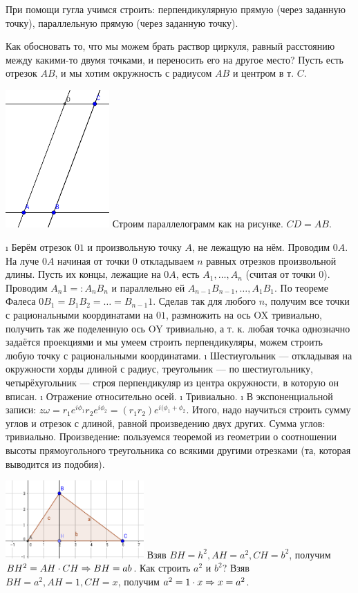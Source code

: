 \begin{solution}
При помощи гугла учимся строить: перпендикулярную прямую (через заданную точку), параллельную прямую (через заданную точку).

Как обосновать то, что мы можем брать раствор циркуля, равный расстоянию между какими-то двумя точками, и переносить его на другое место?
Пусть есть отрезок \(AB\), и мы хотим окружность с радиусом \(AB\) и центром в т. \(C\).

\includegraphics[width=1.56250in]{parallelogram.png}
Строим параллелограмм как на рисунке.
\(CD = AB\).

\begin{enumerate}
\def\labelenumi{\alph{enumi})}
\i
  Берём отрезок \(01\) и произвольную точку \(A\), не лежащую на нём. Проводим \(0A\). На луче \(0A\) начиная от точки \(0\) откладываем \(n\) равных отрезков произвольной длины. Пусть их концы, лежащие на \(0A\), есть \(A_1, \dots, A_n\) (считая от точки \(0\)). Проводим \(A_n1 =: A_n B_n\) и параллельно ей \(A_{n-1}B_{n-1}, \dots, A_1B_1\). По теореме Фалеса \(0B_1 = B_1B_2 = \dots = B_{n-1}1\). Сделав так для любого \(n\), получим все точки с рациональными координатами на \(01\), размножить на ось OX тривиально, получить так же поделенную ось OY тривиально, а т. к. любая точка однозначно задаётся проекциями и мы умеем строить перпендикуляры, можем строить любую точку с рациональными координатами.
\i
  Шестиугольник --- откладывая на окружности хорды длиной с радиус, треугольник --- по шестиугольнику, четырёхугольник --- строя перпендикуляр из центра окружности, в которую он вписан.
\i
  Отражение относительно осей.
\i
  Тривиально.
\i
  В экспоненциальной записи: \(z\omega = r_1e^{i\phi_1}r_2e^{i\phi_2}=(r_1r_2)e^{i(\phi_1 +\phi_2}\).
  Итого, надо научиться строить сумму углов и отрезок с длиной, равной произведению двух других. Сумма углов: тривиально.
  Произведение: пользуемся теоремой из геометрии о соотношении высоты прямоугольного треугольника со всякими другими отрезками (та, которая выводится из подобия).

  \includegraphics[width=2.08333in]{triangle.png}
  Взяв \(BH=h^2, AH=a^2, CH=b^2\), получим \(BH^2=AH\cdot CH \Rightarrow BH=ab\).
  Как строить \(a^2\) и \(b^2\)?
  Взяв \(BH=a^2, AH=1, CH=x\), получим \(a^2=1\cdot x \Rightarrow x=a^2\).
\end{enumerate}

\end{solution}

